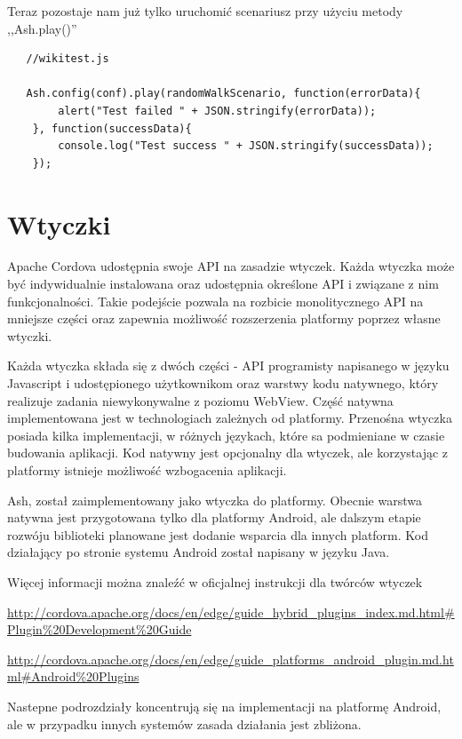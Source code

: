 \documentclass[brudnopis]{xmgr}
\begin{document}
Teraz pozostaje nam już tylko uruchomić scenariusz przy użyciu metody ,,Ash.play()''

\begin{lstlisting}
   //wikitest.js

   Ash.config(conf).play(randomWalkScenario, function(errorData){
        alert("Test failed " + JSON.stringify(errorData));
    }, function(successData){
        console.log("Test success " + JSON.stringify(successData));
    });

\end{lstlisting}

\chapter{Wtyczki}

Apache Cordova udostępnia swoje API na zasadzie wtyczek. Każda wtyczka może być indywidualnie instalowana oraz udostępnia określone API i związane z nim funkcjonalności. Takie podejście pozwala na rozbicie monolitycznego API na mniejsze części oraz zapewnia możliwość rozszerzenia platformy poprzez własne wtyczki.

Każda wtyczka składa się z dwóch części - API programisty napisanego w języku Javascript i udostępionego użytkownikom oraz warstwy kodu natywnego, który realizuje zadania niewykonywalne z poziomu WebView. Część natywna implementowana jest w technologiach zależnych od platformy. Przenośna wtyczka posiada kilka implementacji, w różnych językach, które sa podmieniane w czasie budowania aplikacji. Kod natywny jest opcjonalny dla wtyczek, ale korzystając z platformy istnieje możliwość wzbogacenia aplikacji.

Ash, został zaimplementowany jako wtyczka do platformy. Obecnie warstwa natywna jest przygotowana tylko dla platformy Android, ale dalszym etapie rozwóju biblioteki planowane jest dodanie wsparcia dla innych platform. Kod działający po stronie systemu Android został napisany w języku Java.

Więcej informacji można znaleźć w oficjalnej instrukcji dla twórców wtyczek

\url{http://cordova.apache.org/docs/en/edge/guide\_hybrid\_plugins\_index.md.html\#Plugin\%20Development\%20Guide}  

\url{http://cordova.apache.org/docs/en/edge/guide\_platforms\_android\_plugin.md.html\#Android\%20Plugins}   

Nastepne podrozdziały koncentrują się na implementacji na platformę Android, ale w przypadku innych systemów zasada działania jest zbliżona.
\end{document}
